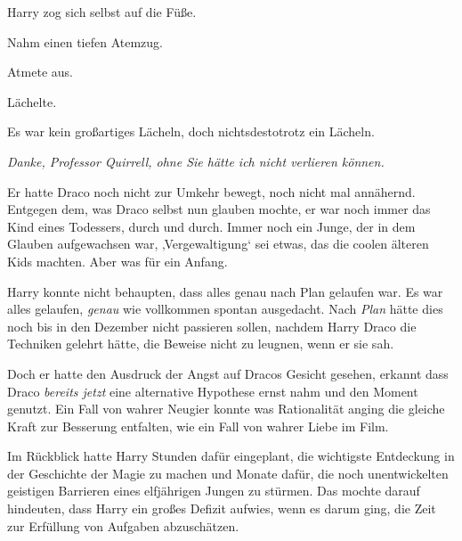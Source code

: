 Harry zog sich selbst auf die Füße.

Nahm einen tiefen Atemzug.

Atmete aus.

Lächelte.

Es war kein großartiges Lächeln, doch nichtsdestotrotz ein Lächeln.

\emph{Danke, Professor Quirrell, ohne Sie hätte ich nicht verlieren können.}

Er hatte Draco noch nicht zur Umkehr bewegt, noch nicht mal annähernd. Entgegen dem, was Draco selbst nun glauben mochte, er war noch immer das Kind eines Todessers, durch und durch. Immer noch ein Junge, der in dem Glauben aufgewachsen war, ‚Vergewaltigung‘ sei etwas, das die coolen älteren Kids machten. Aber was für ein Anfang.

Harry konnte nicht behaupten, dass alles genau nach Plan gelaufen war. Es war alles gelaufen, \emph{genau} wie vollkommen spontan ausgedacht. Nach \emph{Plan} hätte dies noch bis in den Dezember nicht passieren sollen, nachdem Harry Draco die Techniken gelehrt hätte, die Beweise nicht zu leugnen, wenn er sie sah.

Doch er hatte den Ausdruck der Angst auf Dracos Gesicht gesehen, erkannt dass Draco \emph{bereits jetzt} eine alternative Hypothese ernst nahm und den Moment genutzt. Ein Fall von wahrer Neugier konnte was Rationalität anging die gleiche Kraft zur Besserung entfalten, wie ein Fall von wahrer Liebe im Film.

Im Rückblick hatte Harry Stunden dafür eingeplant, die wichtigste Entdeckung in der Geschichte der Magie zu machen und Monate dafür, die noch unentwickelten geistigen Barrieren eines elfjährigen Jungen zu stürmen. Das mochte darauf hindeuten, dass Harry ein großes Defizit aufwies, wenn es darum ging, die Zeit zur Erfüllung von Aufgaben abzuschätzen.


